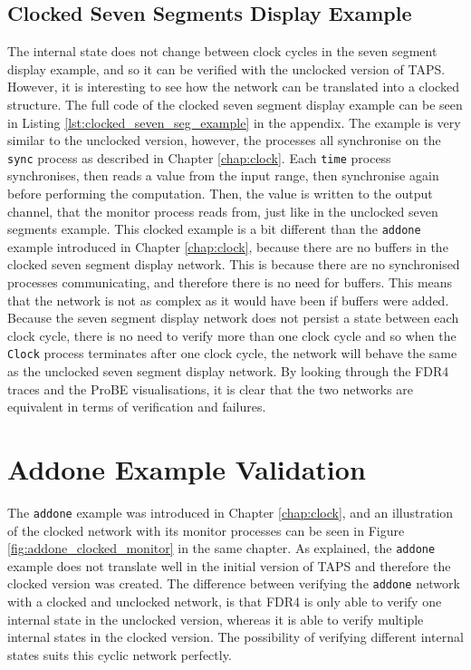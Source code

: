 \subsection{Clocked Seven Segments Display Example}
The internal state does not change between clock cycles in the seven segment display example, and so it can be verified with the unclocked version of TAPS. However, it is interesting to see how the network can be translated into a clocked structure. The full \cspm{} code of the clocked seven segment display example can be seen in Listing \ref{lst:clocked_seven_seg_example} in the appendix. %
The example is very similar to the unclocked version, however, the processes all synchronise on the \texttt{sync} process as described in Chapter \ref{chap:clock}. Each \texttt{time} process synchronises, then reads a value from the input range, then synchronise again before performing the computation. Then, the value is written to the output channel, that the monitor process reads from, just like in the unclocked seven segments example. This clocked example is a bit different than the \texttt{addone} example introduced in Chapter \ref{chap:clock}, because there are no buffers in the clocked seven segment display network. This is because there are no synchronised processes communicating, and therefore there is no need for buffers. This means that the network is not as complex as it would have been if buffers were added.
Because the seven segment display network does not persist a state between each clock cycle, there is no need to verify more than one clock cycle and so when the \texttt{Clock} process terminates after one clock cycle, the network will behave the same as the unclocked seven segment display network. By looking through the FDR4 traces and the ProBE visualisations, it is clear that the two networks are equivalent in terms of verification and failures.
\section{Addone Example Validation}
The \texttt{addone} example was introduced in Chapter \ref{chap:clock}, and an illustration of the clocked network with its monitor processes can be seen in Figure \ref{fig:addone_clocked_monitor} in the same chapter. As explained, the \texttt{addone} example does not translate well in the initial version of TAPS and therefore the clocked version was created.
The difference between verifying the \texttt{addone} network with a clocked and unclocked network, is that FDR4 is only able to verify one internal state in the unclocked version, whereas it is able to verify multiple internal states in the clocked version. The possibility of verifying different internal states suits this cyclic network perfectly.\\

